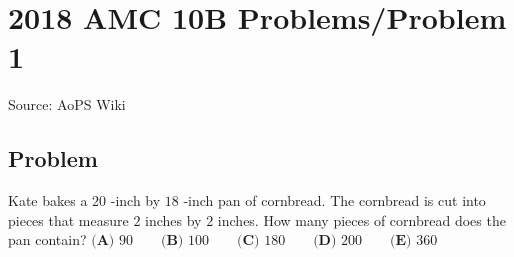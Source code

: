 \documentclass[12pt]{article}
\begin{document}
\section*{{2018 AMC 10B Problems/Problem 1}}
Source: AoPS Wiki

\subsection*{Problem}
Kate bakes a $20$ -inch by $18$ -inch pan of cornbread. The cornbread is cut into pieces that measure $2$ inches by $2$ inches. How many pieces of cornbread does the pan contain? $\textbf{(A) } 90 \qquad \textbf{(B) } 100 \qquad \textbf{(C) } 180 \qquad \textbf{(D) } 200 \qquad \textbf{(E) } 360$
\end{document}

